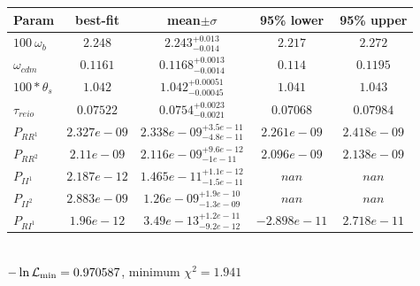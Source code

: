 \begin{tabular}{|l|c|c|c|c|} 
 \hline 
Param & best-fit & mean$\pm\sigma$ & 95\% lower & 95\% upper \\ \hline 
$100~\omega_{b }$ &$2.248$ & $2.243_{-0.014}^{+0.013}$ & $2.217$ & $2.272$ \\ 
$\omega_{cdm }$ &$0.1161$ & $0.1168_{-0.0014}^{+0.0013}$ & $0.114$ & $0.1195$ \\ 
$100*\theta_{s }$ &$1.042$ & $1.042_{-0.00045}^{+0.00051}$ & $1.041$ & $1.043$ \\ 
$\tau_{reio }$ &$0.07522$ & $0.0754_{-0.0021}^{+0.0023}$ & $0.07068$ & $0.07984$ \\ 
$P_{{RR}^1 }$ &$2.327e-09$ & $2.338e-09_{-4.8e-11}^{+3.5e-11}$ & $2.261e-09$ & $2.418e-09$ \\ 
$P_{{RR}^2 }$ &$2.11e-09$ & $2.116e-09_{-1e-11}^{+9.6e-12}$ & $2.096e-09$ & $2.138e-09$ \\ 
$P_{{II}^1 }$ &$2.187e-12$ & $1.465e-11_{-1.5e-11}^{+1.1e-12}$ & $nan$ & $nan$ \\ 
$P_{{II}^2 }$ &$2.883e-09$ & $1.26e-09_{-1.3e-09}^{+1.9e-10}$ & $nan$ & $nan$ \\ 
$P_{{RI}^1 }$ &$1.96e-12$ & $3.49e-13_{-9.2e-12}^{+1.2e-11}$ & $-2.898e-11$ & $2.718e-11$ \\ 
\hline 
 \end{tabular} \\ 
$-\ln{\cal L}_\mathrm{min} =0.970587$, minimum $\chi^2=1.941$ \\ 
